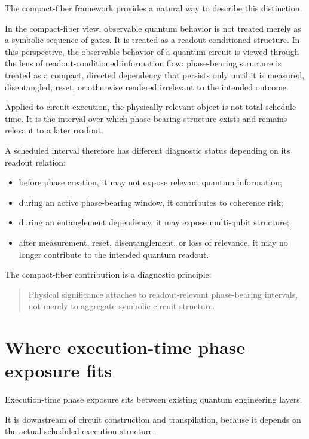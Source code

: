 \documentclass[11pt]{article}
\begin{document}
The compact-fiber framework provides a natural way to describe this distinction.

In the compact-fiber view, observable quantum behavior is not treated merely as a symbolic sequence of gates. It is treated as a readout-conditioned structure. In this perspective, the observable behavior of a quantum circuit is viewed through the lens of readout-conditioned information flow: phase-bearing structure is treated as a compact, directed dependency that persists only until it is measured, disentangled, reset, or otherwise rendered irrelevant to the intended outcome.

Applied to circuit execution, the physically relevant object is not total schedule time. It is the interval over which phase-bearing structure exists and remains relevant to a later readout.

A scheduled interval therefore has different diagnostic status depending on its readout relation:

\begin{itemize}
\item before phase creation, it may not expose relevant quantum information;
\item during an active phase-bearing window, it contributes to coherence risk;
\item during an entanglement dependency, it may expose multi-qubit structure;
\item after measurement, reset, disentanglement, or loss of relevance, it may no longer contribute to the intended quantum readout.
\end{itemize}

The compact-fiber contribution is a diagnostic principle:

\begin{quote}
Physical significance attaches to readout-relevant phase-bearing intervals, not merely to aggregate symbolic circuit structure.
\end{quote}

\section*{Where execution-time phase exposure fits}

Execution-time phase exposure sits between existing quantum engineering layers.

It is downstream of circuit construction and transpilation, because it depends on the actual scheduled execution structure.
\end{document}
